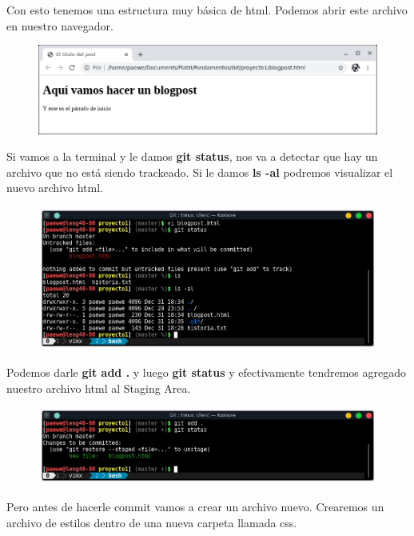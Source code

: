 \documentclass{article}
\begin{document}
Con esto tenemos una estructura muy básica de html. Podemos abrir este archivo
en nuestro navegador.

\newpage

\begin{figure}[h!]
  \centering
  \includegraphics[scale=0.75]{./Pictures/104_blogpost.png}
\end{figure}

Si vamos a la terminal y le damos \textbf{git status}, nos va a detectar que
hay un archivo que no está siendo trackeado. Si le damos \textbf{ls -al}
podremos visualizar el nuevo archivo html.

\begin{figure}[h!]
  \centering
  \includegraphics[scale=0.75]{./Pictures/106_status_ls.png}
\end{figure}

Podemos darle \textbf{git add .} y luego \textbf{git status} y efectivamente
tendremos agregado nuestro archivo html al Staging Area.

\begin{figure}[h!]
  \centering
  \includegraphics[scale=0.75]{./Pictures/107_add_status.png}
\end{figure}

Pero antes de hacerle commit vamos a crear un archivo nuevo. Crearemos un
archivo de estilos dentro de una nueva carpeta llamada css.
\end{document}
